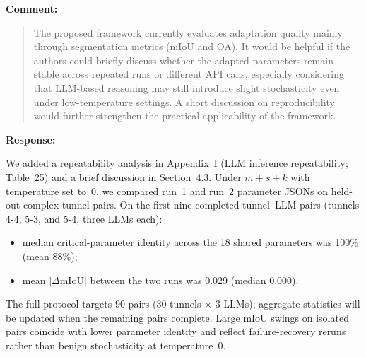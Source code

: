 \documentclass[11pt,a4paper]{article}
\newenvironment{commentblock}{%
  \par\smallskip\noindent\textbf{Comment:}\par
  \begin{quote}\itshape\color{black}
}{%
  \end{quote}\smallskip
}
\newenvironment{responseblock}{%
  \par\smallskip\noindent\textbf{Response:}\par
  \begingroup\color{responsegreen}
}{%
  \endgroup\smallskip
}
\begin{document}
\begin{commentblock}
The proposed framework currently evaluates adaptation quality mainly through segmentation metrics (mIoU and OA). It would be helpful if the authors could briefly discuss whether the adapted parameters remain stable across repeated runs or different API calls, especially considering that LLM-based reasoning may still introduce slight stochasticity even under low-temperature settings. A short discussion on reproducibility would further strengthen the practical applicability of the framework.
\end{commentblock}
\begin{responseblock}
We added a repeatability analysis in Appendix~I (LLM inference repeatability; Table~25) and a brief discussion in Section~4.3. Under $m+s+k$ with temperature set to~0, we compared run~1 and run~2 parameter JSONs on held-out complex-tunnel pairs. On the first nine completed tunnel--LLM pairs (tunnels 4-4, 5-3, and 5-4, three LLMs each):
\begin{itemize}[nosep]
  \item median critical-parameter identity across the 18 shared parameters was 100\% (mean 88\%);
  \item mean $|\Delta\text{mIoU}|$ between the two runs was 0.029 (median 0.000).
\end{itemize}
The full protocol targets 90 pairs (30 tunnels $\times$ 3 LLMs); aggregate statistics will be updated when the remaining pairs complete. Large mIoU swings on isolated pairs coincide with lower parameter identity and reflect failure-recovery reruns rather than benign stochasticity at temperature~0.
\end{responseblock}
\end{document}
